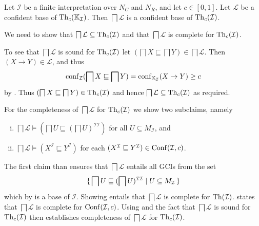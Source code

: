 \begin{Theorem}
  \label{thm:confident-bases-of-GCIs-from-confident-bases-of-implications}
  Let $\mathcal{I}$ be a finite interpretation over $N_C$ and $N_R$, and let $c \in
  [0,1]$.  Let $\mathcal{L}$ be a confident base of $\operatorname{Th}_c({\mathbb{K}}_{\mathcal{I}})$.  Then
  $\bigsqcap \mathcal{L}$ is a confident base of $\operatorname{Th}_c(\mathcal{I})$.
\end{Theorem}
\begin{Proof}
  We need to show that $\bigsqcap \mathcal{L} \subseteq \operatorname{Th}_c(\mathcal{I})$ and that
  $\bigsqcap \mathcal{L}$ is complete for $\operatorname{Th}_c(\mathcal{I})$.

  To see that $\bigsqcap \mathcal{L}$ is sound for $\operatorname{Th}_c(\mathcal{I})$ let $(\bigsqcap X
  \sqsubseteq \bigsqcap Y) \in \bigsqcap \mathcal{L}$.  Then $(X \to Y) \in \mathcal{L}$,
  and thus
  \begin{equation*}
    \operatorname{conf}_{\mathcal{I}}(\bigsqcap X \sqsubseteq \bigsqcap Y) = \operatorname{conf}_{{\mathbb{K}}_{\mathcal{I}}}(X \to Y) \ge c
  \end{equation*}
  by .  Thus
  $(\bigsqcap X \sqsubseteq \bigsqcap Y) \in \operatorname{Th}_c(\mathcal{I})$ and hence $\bigsqcap
  \mathcal{L} \subseteq \operatorname{Th}_c(\mathcal{I})$ as required.

  For the completeness of $\bigsqcap \mathcal{L}$ for $\operatorname{Th}_c(\mathcal{I})$ we show two
  subclaims, namely
  \begin{enumerate}[i. ]
  \item\label{item:16} $\bigsqcap \mathcal{L} \models (\bigsqcap U \sqsubseteq (\bigsqcap
    U)^{\mathcal{I}\mathcal{I}})$ for all $U \subseteq M_{\mathcal{I}}$, and
  \item\label{item:17} $\bigsqcap \mathcal{L} \models (X^{\mathcal{I}} \sqsubseteq
    Y^{\mathcal{I}})$ for each $(X^{\mathcal{I}} \sqsubseteq Y^{\mathcal{I}}) \in
    \operatorname{Conf}(\mathcal{I}, c)$.
  \end{enumerate}
  The first claim than ensures that $\bigsqcap \mathcal{L}$ entails all GCIs from the set
  \begin{equation*}
    {\ensuremath{\{\, \bigsqcap U \sqsubseteq (\bigsqcap U)^{\mathcal{I}\mathcal{I}} \mid U \subseteq
      M_{\mathcal{I}} \,\}}}
  \end{equation*}
  which by  is a base of $\mathcal{I}$.  Showing 
  entails that $\bigsqcap \mathcal{L}$ is complete for $\operatorname{Th}(\mathcal{I})$.  
  states that $\bigsqcap \mathcal{L}$ is complete for $\operatorname{Conf}(\mathcal{I}, c)$.  Using
   and the fact that $\bigsqcap \mathcal{L}$
  is sound for $\operatorname{Th}_c(\mathcal{I})$ then establishes completeness of $\bigsqcap
  \mathcal{L}$ for $\operatorname{Th}_c(\mathcal{I})$.


\end{Proof}
